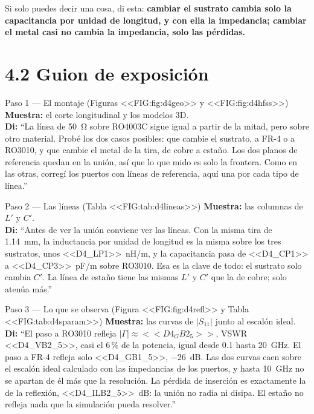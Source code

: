 \documentclass[11pt,letterpaper]{article}
\begin{document}
Si solo puedes decir una cosa, di esta: \textbf{cambiar el sustrato cambia solo la capacitancia por unidad de longitud, y con ella la impedancia; cambiar el metal casi no cambia la impedancia, solo las pérdidas.}

\section*{4.2 Guion de exposición}

\begin{paso}{Paso 1 --- El montaje (Figuras <<FIG:fig:d4geo>> y <<FIG:fig:d4hfss>>)}
\textbf{Muestra:} el corte longitudinal y los modelos 3D.\\
\textbf{Di:} ``La línea de \SI{50}{\ohm} sobre RO4003C sigue igual a partir de la mitad, pero sobre otro material. Probé los dos casos posibles: que cambie el sustrato, a FR-4 o a RO3010, y que cambie el metal de la tira, de cobre a estaño. Los dos planos de referencia quedan en la unión, así que lo que mido es solo la frontera. Como en las otras, corregí los puertos con líneas de referencia, aquí una por cada tipo de línea.''
\end{paso}

\begin{paso}{Paso 2 --- Las líneas (Tabla <<FIG:tab:d4lineas>>)}
\textbf{Muestra:} las columnas de $L'$ y $C'$.\\
\textbf{Di:} ``Antes de ver la unión conviene ver las líneas. Con la misma tira de \SI{1.14}{mm}, la inductancia por unidad de longitud es la misma sobre los tres sustratos, unos <<D4_LP1>>~nH/m, y la capacitancia pasa de <<D4_CP1>> a <<D4_CP3>>~pF/m sobre RO3010. Esa es la clave de todo: el sustrato solo cambia $C'$. La línea de estaño tiene las mismas $L'$ y $C'$ que la de cobre; solo atenúa más.''
\end{paso}

\begin{paso}{Paso 3 --- Lo que se observa (Figura <<FIG:fig:d4refl>> y Tabla <<FIG:tab:d4sparam>>)}
\textbf{Muestra:} las curvas de $|S_{11}|$ junto al escalón ideal.\\
\textbf{Di:} ``El paso a RO3010 refleja $|\Gamma|\approx<<D4_GB2_5>>$, VSWR <<D4_VB2_5>>, casi el 6\,\% de la potencia, igual desde \SI{0.1}{} hasta \SI{20}{GHz}. El paso a FR-4 refleja solo <<D4_GB1_5>>, \SI{-26}{dB}. Las dos curvas caen sobre el escalón ideal calculado con las impedancias de los puertos, y hasta \SI{10}{GHz} no se apartan de él más que la resolución. La pérdida de inserción es exactamente la de la reflexión, \SI{<<D4_ILB2_5>>}{dB}: la unión no radia ni disipa. El estaño no refleja nada que la simulación pueda resolver.''
\end{paso}
\end{document}
